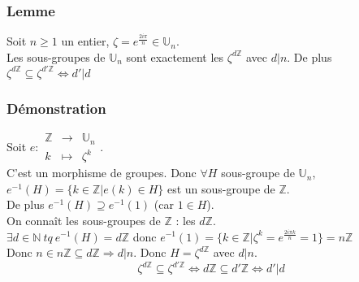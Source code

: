 \documentclass[a4paper, oneside]{report}
\newcommand{\N}{\mathbb{N}}
\newcommand{\Z}{\mathbb{Z}}
\newcommand{\U}{\mathbb{U}}
\begin{document}
\subsubsection{Lemme}
Soit $n\geq 1$ un entier, $\zeta = e^{\frac{2i\pi}{n}}\in \U_n$.\\
Les sous-groupes de $\U_n$ sont exactement les $\zeta^{d\Z}$ avec $d|n$. De plus $\zeta^{d\Z} \subseteq \zeta^{d'\Z} \Leftrightarrow d'|d$

\subsubsection{Démonstration}
Soit $e : \begin{array}{lll}
\Z &\rightarrow &\U_n\\
k&\mapsto& \zeta^k
\end{array}$.\\
C'est un morphisme de groupes. Donc $\forall H$ sous-groupe de $\U_n$, $e^{-1}(H)=\{k\in \Z |e(k)\in H \}$ est un sous-groupe de $\Z$.\\
De plus $e^{-1}(H)\supseteq e^{-1}(1)$ (car $1\in H$).\\
On connaît les sous-groupes de $\Z$ : les $d\Z$.\\
$\exists d\in \N~tq~ e^{-1}(H)=d\Z$ donc $e^{-1}(1)=\{k\in \Z | \zeta^k= e^{\frac{2i\pi k}{n}} =1 \}=n\Z$\\
Donc $n\in n\Z \subseteq d\Z \Rightarrow d|n$. Donc $H=\zeta^{d\Z}$ avec $d|n$.
$$\zeta^{d\Z}\subseteq \zeta^{d'\Z}\Leftrightarrow d\Z \subseteq d'\Z \Leftrightarrow d'|d$$
\end{document}

